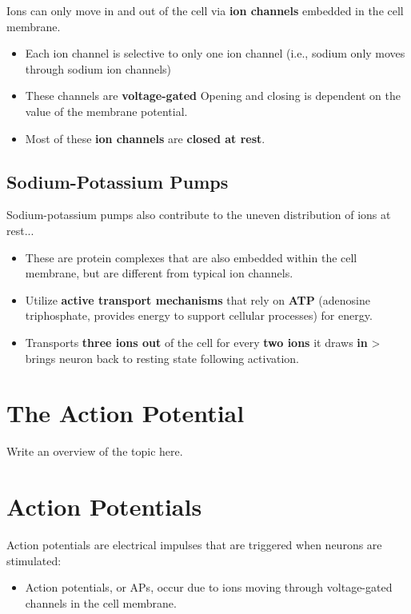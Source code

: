 \documentclass[12pt,a4paper]{article}
\begin{document}
	Ions can only move in and out of the cell via \textbf{ion channels} embedded in the cell membrane.
	\begin{itemize}
		\item Each ion channel is selective to only one ion channel (i.e., sodium only moves through sodium ion channels)
		\item These channels are \textbf{voltage-gated}
		\subitem Opening and closing is dependent on the value of the membrane potential. 
		\item Most of these \textbf{ion channels} are \textbf{closed at rest}.
	\end{itemize}
	
	\subsection{Sodium-Potassium Pumps}
	
	Sodium-potassium pumps also contribute to the uneven distribution of ions at rest...
	
	\begin{itemize}
		\item These are protein complexes that are also embedded within the cell membrane, but are different from typical ion channels. 
		\item Utilize \textbf{active transport mechanisms} that rely on \textbf{ATP} (adenosine triphosphate, provides energy to support cellular processes) for energy. 
		\item Transports \textbf{three  ions out} of the cell for every \textbf{two  ions} it draws \textbf{in} > brings neuron back to resting state following activation. 
	\end{itemize} 
	
	\section*{The Action Potential}
	Write an overview of the topic here.
	
	\section{Action Potentials}
	
	Action potentials are electrical impulses that are triggered when neurons are stimulated: 
	\begin{itemize}
		\item Action potentials, or APs, occur due to ions moving through voltage-gated channels in the cell membrane.
	\end{itemize}
	
\end{document}
